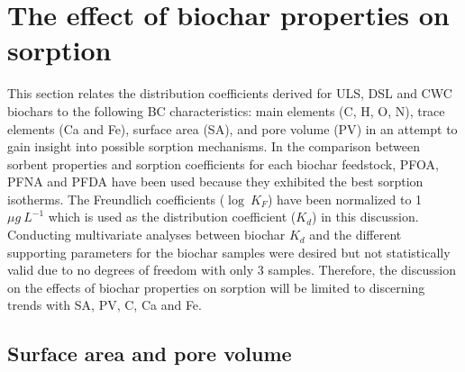 
\section{The effect of biochar properties on sorption}
This section relates the distribution coefficients derived for ULS, DSL and CWC biochars to the following BC characteristics: main elements (C, H, O, N), trace elements (Ca and Fe), surface area (\acrshort{SA}), and pore volume (\acrshort{PV}) in an attempt to gain insight into possible sorption mechanisms. In the comparison between sorbent properties and sorption coefficients for each biochar feedstock, PFOA, PFNA and PFDA have been used because they exhibited the best sorption isotherms. The Freundlich coefficients ($\log~K_F$) have been normalized to 1 $\mu g~L^{-1}$ which is used as the distribution coefficient ($K_d$) in this discussion. Conducting multivariate analyses between biochar $K_d$ and the different supporting parameters for the biochar samples were desired but not statistically valid due to no degrees of freedom with only 3 samples. Therefore, the discussion on the effects of biochar properties on sorption will be limited to discerning trends with SA, PV, C, Ca and Fe. 

\subsection{Surface area and pore volume}\label{sec:SAPV}


